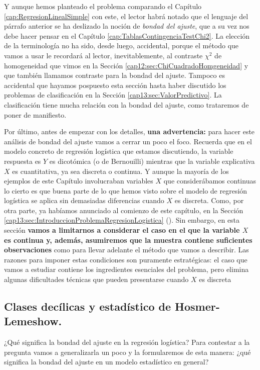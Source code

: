 Y aunque hemos planteado el problema comparando el Capítulo \ref{cap:RegresionLinealSimple} con este, el lector habrá notado que el lenguaje del párrafo anterior se ha deslizado la noción de {\em bondad del ajuste}, que a su vez nos debe hacer pensar en el Capítulo \ref{cap:TablasContingenciaTestChi2}. 	La elección de la terminología no ha sido, desde luego, accidental, porque el método que vamos a usar le recordará al lector, inevitablemente, al contraste $\chi^2$ de homogeneidad  que vimos en la Sección \ref{cap12:sec:ChiCuadradoHomgeneidad} y que también llamamos contraste para la bondad del ajuste. Tampoco es accidental que hayamos pospuesto esta sección hasta haber discutido los problemas de clasificación en la Sección \ref{cap13:sec:ValorPredictivo}. La clasificación tiene mucha relación con la bondad del ajuste, como trataremos de poner de manifiesto.

Por último, antes de empezar con los detalles, {\bf una advertencia:} para hacer este análisis de bondad del ajuste vamos a cerrar un poco el foco. Recuerda que en el modelo concreto de regresión logística que estamos discutiendo, la variable respuesta es $Y$ es dicotómica (o de Bernouilli) mientras que la variable explicativa $X$ es cuantitativa, ya sea discreta o continua. Y aunque la mayoría de los ejemplos de este Capítulo involucraban variables $X$ que considerábamos continuas lo cierto es que buena parte de lo que  hemos visto sobre el modelo de regresión logística se aplica sin demasiadas diferencias cuando $X$ es discreta. Como, por otra parte,
ya habíamos anunciado al comienzo de este capítulo, en la Sección \ref{cap13:sec:IntroduccionProblemaRegresionLogistica} (\pageref{cap13:sec:IntroduccionProblemaRegresionLogistica}).  Sin embargo, en esta sección {\bf vamos a  limitarnos a considerar el caso en el que la variable $X$ es continua y, además, asumiremos que  la muestra contiene suficientes observaciones} como para llevar adelante el método que vamos a describir.
Las razones para imponer estas condiciones son puramente estratégicas: el caso que vamos a estudiar contiene los ingredientes esenciales del problema, pero elimina algunas dificultades técnicas que pueden presentarse cuando $X$ es  discreta

\subsection{Clases decílicas y estadístico de Hosmer-Lemeshow.}

¿Qué significa la bondad del ajuste en la regresión logística? Para contestar a la pregunta vamos a generalizarla un poco y la formularemos de esta manera: ¿qué significa la bondad del ajuste en un modelo estadístico en general?

